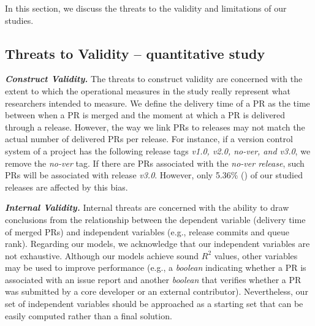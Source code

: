 In this section, we discuss the threats to the validity and limitations of our studies.

\subsection{\textbf{Threats to Validity -- quantitative study}}

\textit{\textbf{Construct Validity.}} The threats to construct validity are concerned with the extent to which the
operational measures in the study really represent what researchers intended to measure. We define the delivery time of a PR as the time between when a PR is merged and the moment at which a PR is delivered through a release. However, the way we link PRs to releases may not match the actual number of delivered PRs per release. For instance, if a version control system of a project has the following release tags \textit{v1.0, v2.0, no-ver, and v3.0}, we
remove the \textit{no-ver} tag. If there are PRs associated with the
\textit{no-ver release}, such PRs will be associated with release
\textit{v3.0}. However, only 5.36\% () of our studied
releases are affected by this bias.

\noindent\textit{\textbf{Internal Validity.}} Internal threats are concerned with the
ability to draw conclusions from the relationship between the dependent
variable (delivery time of merged PRs) and independent variables (e.g.,
release commits and queue rank). 
Regarding our models, we acknowledge that our independent variables
are not exhaustive. Although our models achieve sound $R^2$ values, other variables may
be used to improve performance (e.g., a \textit{boolean} indicating whether a PR
is associated with an issue report and another \textit{boolean} that verifies whether a PR was submitted by a core developer or an external contributor). Nevertheless, our set of independent variables
should be approached as a starting set that can be easily computed rather than a final solution.

